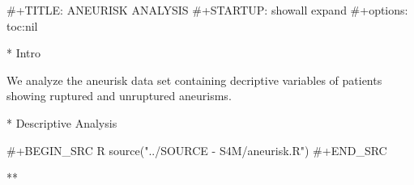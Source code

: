 #+TITLE: ANEURISK ANALYSIS
#+STARTUP: showall expand
#+options: toc:nil

* Intro

We analyze the aneurisk data set containing decriptive variables of patients showing ruptured and
unruptured aneurisms.

* Descriptive Analysis

#+BEGIN_SRC R 
source("../SOURCE - S4M/aneurisk.R")
#+END_SRC

** 
